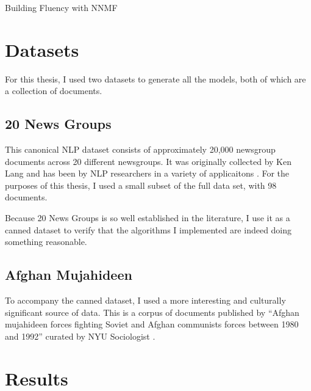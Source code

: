 \documentclass[12pt]{pom_thesis}
\begin{document}
\begin{chapter}{Building Fluency with NNMF}
	\section{Datasets}
	For this thesis, I used two datasets to generate all the models, both of which are a collection of documents. 
	\subsection*{20 News Groups}
	This canonical NLP dataset consists of approximately 20,000 newsgroup documents across 20 different newsgroups. It was originally collected by Ken Lang and has been by NLP researchers in a variety of applicaitons \cite{20news}. For the purposes of this thesis, I used a small subset of the full data set, with 98 documents. 
	
	Because 20 News Groups is so well established in the literature, I use it as a canned dataset to verify that the algorithms I implemented are indeed doing something reasonable. 
		\subsection*{Afghan Mujahideen}
		To accompany the canned dataset, I used a more interesting and culturally significant source of data. This is a corpus of documents published by ``Afghan mujahideen forces fighting Soviet and Afghan communists forces between 1980 and 1992'' curated by NYU Sociologist . 
	\section*{Results}
\end{chapter}
\end{document}
